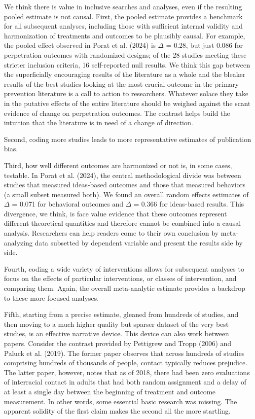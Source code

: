 \documentclass[
  man]{apa6}
\begin{document}
We think there is value in inclusive searches and analyses, even if the resulting pooled estimate is not causal. First, the pooled estimate provides a benchmark for all subsequent analyses, including those with sufficient internal validity and harmonization of treatments and outcomes to be plausibly causal. For example, the pooled effect observed in Porat et al. (2024) is \(\Delta\) = 0.28, but just 0.086 for perpetration outcomes with randomized designs; of the 28 studies meeting these stricter inclusion criteria, 16 self-reported null results. We think this gap between the superficially encouraging results of the literature as a whole and the bleaker results of the best studies looking at the most crucial outcome in the primary prevention literature is a call to action to researchers. Whatever solace they take in the putative effects of the entire literature should be weighed against the scant evidence of change on perpetration outcomes. The contrast helps build the intuition that the literature is in need of a change of direction.

Second, coding more studies leads to more representative estimates of publication bias.

Third, how well different outcomes are harmonized or not is, in some cases, testable. In Porat et al. (2024), the central methodological divide was between studies that measured ideas-based outcomes and those that measured behaviors (a small subset measured both). We found an overall random effects estimates of \(\Delta\) = 0.071 for behavioral outcomes and \(\Delta\) = 0.366 for ideas-based results. This divergence, we think, is face value evidence that these outcomes represent different theoretical quantities and therefore cannot be combined into a causal analysis. Researchers can help readers come to their own conclusion by meta-analyzing data subsetted by dependent variable and present the results side by side.

Fourth, coding a wide variety of interventions allows for subsequent analyses to focus on the effects of particular interventions, or classes of intervention, and comparing them. Again, the overall meta-analytic estimate provides a backdrop to these more focused analyses.

Fifth, starting from a precise estimate, gleaned from hundreds of studies, and then moving to a much higher quality but sparser dataset of the very best studies, is an effective narrative device. This device can also work between papers. Consider the contrast provided by Pettigrew and Tropp (2006) and Paluck et al. (2019). The former paper observes that across hundreds of studies comprising hundreds of thousands of people, contact typically reduces prejudice. The latter paper, however, notes that as of 2018, there had been zero evaluations of interracial contact in adults that had both random assignment and a delay of at least a single day between the beginning of treatment and outcome measurement. In other words, some essential basic research was missing. The apparent solidity of the first claim makes the second all the more startling.
\end{document}
